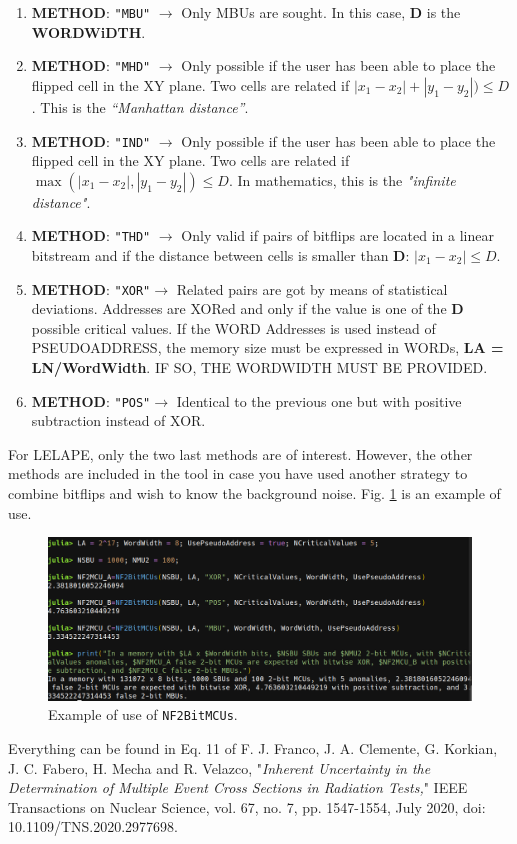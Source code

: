 \begin{itemize}
	\begin{enumerate}
		\item \textbf{METHOD}: \texttt{"MBU"} \(\rightarrow\) Only MBUs are sought. In this case, \textbf{D} is the \textbf{WORDWiDTH}.
		\item \textbf{METHOD}: \texttt{"MHD"} \(\rightarrow\)  Only possible if the user has been able to place the flipped	cell in the XY plane. Two cells are related if \(\left|x_1-x_2\right|+ \left|y_1-y_2\right|) \le D\). This  is the \textit{``Manhattan distance''}.
		\item \textbf{METHOD}: \texttt{"IND"} \(\rightarrow\)  Only possible if the user has been able to place the flipped	cell in the XY plane. Two cells are related if \(\max(\left|x_1-x_2\right|, \left|y_1-y_2\right|) \le D\). In mathematics, this is the \textit{"infinite distance"}.
		\item \textbf{METHOD}: \texttt{"THD"} \(\rightarrow\)  Only valid if pairs of bitflips are located in a linear bitstream and if the
		distance between cells is smaller than \textbf{D}: \(\left|x_1-x_2\right| \le D\).
		\item \textbf{METHOD}: \texttt{"XOR"}\(\rightarrow\)  Related pairs are got by means of statistical deviations. Addresses are XORed 
		and only if the value is one of the \textbf{D} possible critical values. If the WORD Addresses  
		is used instead of PSEUDOADDRESS, the memory size must be expressed in WORDs, \textbf{LA = LN/WordWidth}.
		IF SO, THE WORDWIDTH MUST BE PROVIDED.
		\item \textbf{METHOD}: \texttt{"POS"}\(\rightarrow\)  Identical to the previous one but with positive subtraction instead of XOR.
	\end{enumerate}
	
	For LELAPE, only the two last methods are of interest. However, the other methods are included in the tool in case you have used another strategy to combine bitflips and wish to know the background noise. Fig. \ref{fig:Example_NF2BitMCUs} is an example of use.
	
	\begin{figure}[h!]
		\centering
		\includegraphics[width=0.75\columnwidth]{fig/functions/NF2BitMCUs.png}
		\caption{Example of use of \texttt{NF2BitMCUs}.}
		\label{fig:Example_NF2BitMCUs}
	\end{figure}	
	
	Everything can be found in Eq. 11 of F. J. Franco, J. A. Clemente, G. Korkian, 
	J. C. Fabero, H. Mecha and R. Velazco, "\textit{Inherent Uncertainty in the Determination of Multiple 
		Event Cross Sections in Radiation Tests,}" IEEE Transactions on Nuclear Science, vol. 67, no. 7, 
	pp. 1547-1554, July 2020, doi: 10.1109/TNS.2020.2977698.
	
\end{itemize}
%
